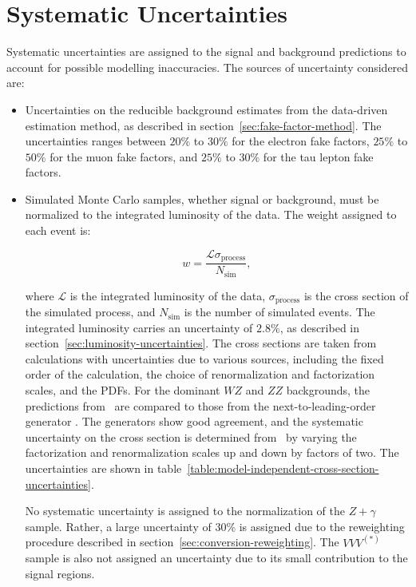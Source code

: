 \section{Systematic Uncertainties}\label{sec:model-independent-systematics}
Systematic uncertainties are assigned to the signal and background predictions to account for possible modelling inaccuracies. The sources of uncertainty considered are:

\begin{itemize}
	\item Uncertainties on the reducible background estimates from the data-driven estimation method, as described in section~\ref{sec:fake-factor-method}. The uncertainties ranges between $20\%$ to $30\%$ for the electron fake factors, $25\%$ to $50\%$ for the muon fake factors, and $25\%$ to $30\%$ for the tau lepton fake factors.

  \item  Simulated Monte Carlo samples, whether signal or background, must be normalized to the integrated luminosity of the data. The weight assigned to each event is:
  
  \begin{equation}
   w = \frac{\mathcal{L} \sigma_{\mathrm{process}}}{N_{\mathrm{sim}}},
  \end{equation}
  
  where $\mathcal{L}$ is the integrated luminosity of the data, $\sigma_{\mathrm{process}}$ is the cross section of the simulated process, and $N_{\mathrm{sim}}$ is the number of simulated events. The integrated luminosity carries an uncertainty of $2.8\%$, as described in section~\ref{sec:luminosity-uncertainties}. The cross sections are taken from calculations with uncertainties due to various sources, including the fixed order of the calculation, the choice of renormalization and factorization scales, and the PDFs. For the dominant $WZ$ and $ZZ$ backgrounds, the predictions from \sherpa\ are compared to those from the next-to-leading-order generator \vbfnlo. The generators show good agreement, and the systematic uncertainty on the cross section is determined from \vbfnlo\ by varying the factorization and renormalization scales up and down by factors of two. The uncertainties are shown in table~\ref{table:model-independent-cross-section-uncertainties}. 

  No systematic uncertainty is assigned to the normalization of the $Z+\gamma$ sample. Rather, a large uncertainty of 30\% is assigned due to the reweighting procedure described in section~\ref{sec:conversion-reweighting}. The $VVV^{(*)}$ sample is also not assigned an uncertainty due to its small contribution to the signal regions.
  

\end{itemize}
